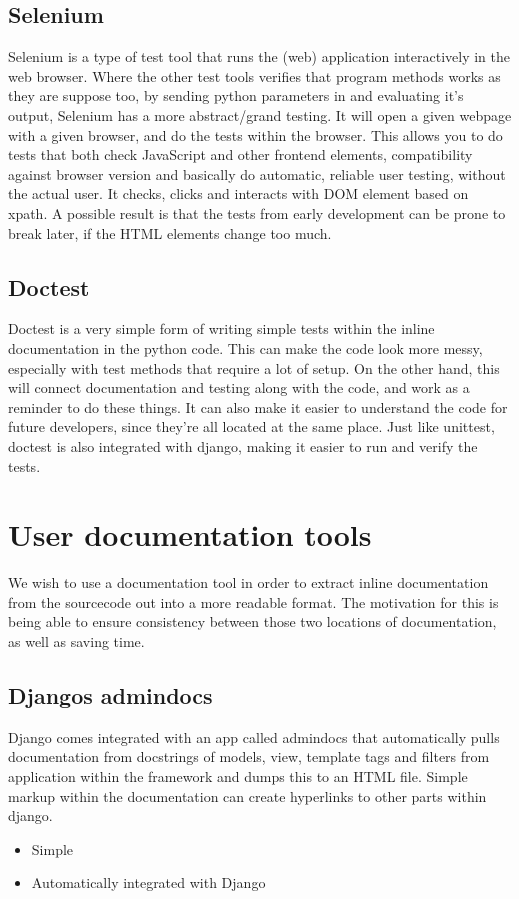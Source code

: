 \documentclass{report}
\begin{document}
\subsection{Selenium}
Selenium\cite{website:selenium} is a type of test tool that runs the (web) application interactively in the web browser. Where the other test tools verifies that program methods works as they are suppose too, by sending python parameters in and evaluating it’s output, Selenium has a more abstract/grand testing. It will open a given webpage with a given browser, and do the tests within the browser. This allows you to do tests that both check JavaScript and other frontend elements, compatibility against browser version and basically do automatic, reliable user testing, without the actual user. It checks, clicks and interacts with DOM element based on xpath. A possible result is that the tests from early development can be prone to break later, if the HTML elements change too much\cite{website:django_doctest}.

\subsection{Doctest}
Doctest\cite{website:doctest} is a very simple form of writing simple tests within the inline documentation in the python code. This can make the code look more messy, especially with test methods that require a lot of setup. On the other hand, this will connect documentation and testing along with the code, and work as a reminder to do these things. It can also make it easier to understand the code for future developers, since they’re all located at the same place. 
Just like unittest, doctest is also integrated with django, making it easier to run and verify the tests.

\newpage
\section{User documentation tools}
We wish to use a documentation tool in order to extract inline documentation from the sourcecode out into a more readable format. The motivation for this is being able to ensure consistency between those two locations of documentation, as well as saving time.
\subsection{Djangos admindocs}
Django comes integrated with an app called admindocs\cite{website:django_admindocs} that automatically pulls documentation from docstrings of models, view, template tags and filters from application within the framework and dumps this to an HTML file. Simple markup within the documentation can create hyperlinks to other parts within django.
\begin{itemize}
\item Simple
\item Automatically integrated with Django
\end{itemize}
\end{document}
